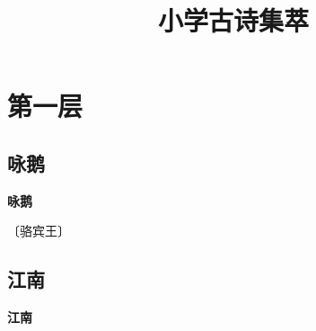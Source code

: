 \documentclass[12pt,UTF-8,openany,fontset=none]{ctexbook}
\title{\zihao{0} \bfseries 小学古诗集萃}
\author{}
\date{}
\begin{document}
\maketitle
\tableofcontents
\newpage

\chapter{第一层}
\clearpage

\section{咏鹅}



\begin{center}
    {\bfseries 咏鹅}

    \vspace{10pt}
    
    \begin{large}
        
        〔骆宾王〕
        
    \end{large}
    
    \vspace{8pt}
    
    \begin{huge}
        
        \phantom{鹅鹅}
        
        \phantom{。}
        
        \phantom{。}
        
        \phantom{。}
        
    \end{huge}
    
\end{center}

\vspace{8pt}
\clearpage

\section{江南}



\begin{center}
    {\bfseries 江南}
\end{center}
\end{document}
